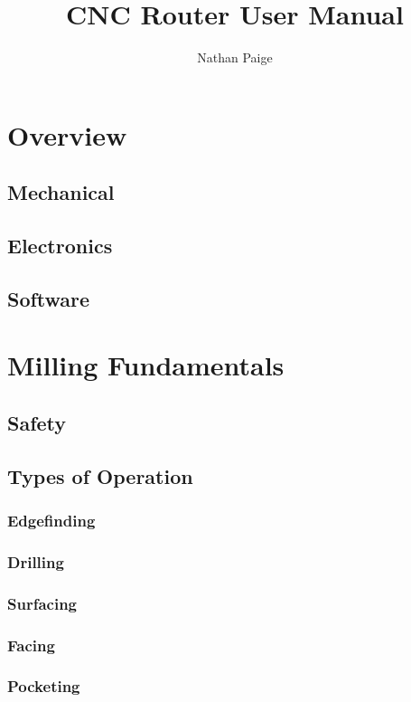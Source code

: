 \documentclass[a4paper,11pt]{article}
\title{CNC Router User Manual}
\author{Nathan Paige}
\begin{document}
\maketitle

\section{Overview}
\subsection{Mechanical}
\subsection{Electronics}
\subsection{Software}



\section{Milling Fundamentals}

\subsection{Safety}

\subsection{Types of Operation}
\subsubsection{Edgefinding}
\subsubsection{Drilling}
\subsubsection{Surfacing}
\subsubsection{Facing}
\subsubsection{Pocketing}
\end{document}
